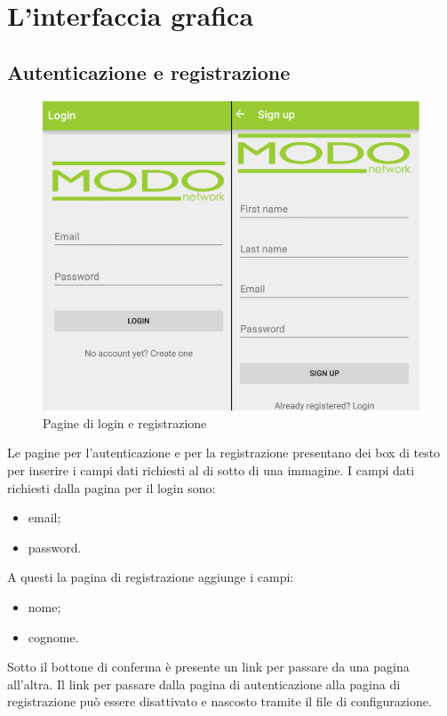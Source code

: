 \section{L'interfaccia grafica}
	\subsection{Autenticazione e registrazione}
	\begin{figure}[H]
		\centering
		\includegraphics[scale=0.1]{images/prodotto_finale/loginSignUp}
			\caption{Pagine di login e registrazione}
	\end{figure}
	Le pagine per l'autenticazione e per la registrazione presentano dei box di testo per inserire i campi dati richiesti al di sotto di una immagine. I campi dati richiesti dalla pagina per il login sono:
	\begin{itemize}
		\item email;
		\item password.
	\end{itemize}
	A questi la pagina di registrazione aggiunge i campi:
	\begin{itemize}
		\item nome;
		\item cognome.
	\end{itemize}
	Sotto il bottone di conferma è presente un link per passare da una pagina all'altra. Il link per passare dalla pagina di autenticazione alla pagina di registrazione può essere disattivato e nascosto tramite il file di configurazione.

